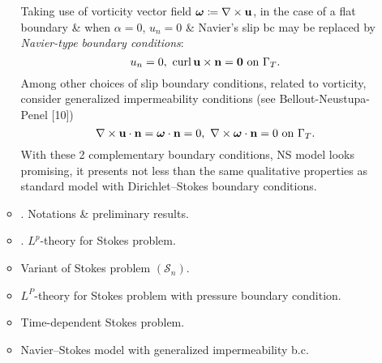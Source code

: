 \documentclass{article}
\begin{document}
\begin{enumerate}
\begin{itemize}
		Taking use of vorticity vector field $\boldsymbol{\omega}\coloneqq\nabla\times{\bf u}$, in the case of a flat boundary \& when $\alpha = 0$, $u_n = 0$ \& Navier's slip bc may be replaced by {\it Navier-type boundary conditions}:
		\begin{equation}
			u_n = 0,\ \operatorname{curl}{\bf u}\times{\bf n} = {\bf 0}\mbox{ on }\Gamma_T.
		\end{equation}
		Among other choices of slip boundary conditions, related to vorticity, consider generalized impermeability conditions (see Bellout-Neustupa-Penel [10])
		\begin{equation}
			\nabla\times{\bf u}\cdot{\bf n} = \boldsymbol{\omega}\cdot{\bf n} = 0,\ \nabla\times\boldsymbol{\omega}\cdot{\bf n} = 0\mbox{ on }\Gamma_T.
		\end{equation}
		With these 2 complementary boundary conditions, NS model looks promising, it presents not less than the same qualitative properties as standard model with Dirichlet--Stokes boundary conditions.
		
		\item {. Notations \& preliminary results.}
		\item {. $L^p$-theory for Stokes problem.}
		\item {\sf Variant of Stokes problem $(\mathcal{S}_n)$.}
		\item {\sf$L^P$-theory for Stokes problem with pressure boundary condition.}
		\item {\sf Time-dependent Stokes problem.}
		\item {\sf Navier--Stokes model with generalized impermeability b.c.}
	\end{itemize}
		

\end{enumerate}
\end{document}
